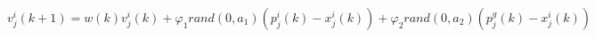 \documentclass{article}
\begin{document}
    \begin{equation}
        v^i_j(k+1) = w(k)v^i_j(k) + {\varphi}_1rand(0,a_1)(p^i_j(k)-x^i_j(k)) + {\varphi}_2rand(0,a_2)(p^g_j(k)-x^i_j(k))
    \end{equation}
\end{document}
